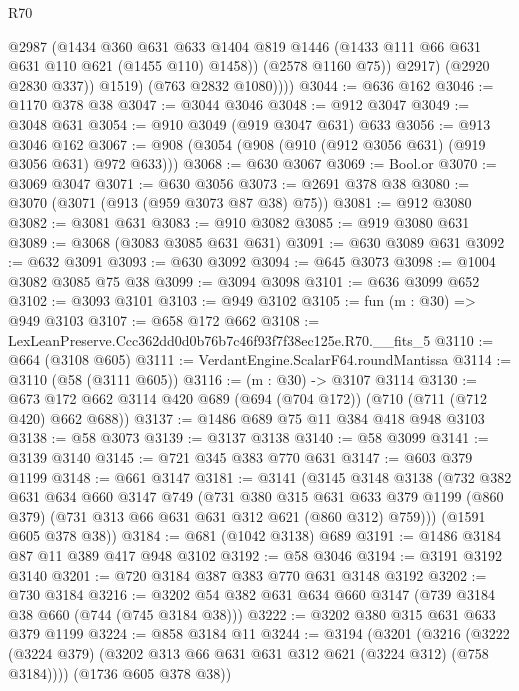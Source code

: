 \begin{lexlean}{R70}
\begin{coremodule}
                  @2987
                  (@1434
                    @360
                    @631
                    @633
                    @1404
                    @819
                    @1446
                    (@1433 @111 @66 @631 @631 @110 @621 (@1455 @110) @1458))
                  (@2578 @1160 @75))
                @2917)
              (@2920 @2830 @337))
            @1519)
          (@763 @2832 @1080))))
@3044 := @636 @162
@3046 := @1170 @378 @38
@3047 := @3044 @3046
@3048 := @912 @3047
@3049 := @3048 @631
@3054 := @910 @3049 (@919 @3047 @631) @633
@3056 := @913 @3046 @162
@3067 := @908 (@3054 (@908 (@910 (@912 @3056 @631) (@919 @3056 @631) @972 @633)))
@3068 := @630 @3067
@3069 := Bool.or
@3070 := @3069 @3047
@3071 := @630 @3056
@3073 := @2691 @378 @38
@3080 := @3070 (@3071 (@913 (@959 @3073 @87 @38) @75))
@3081 := @912 @3080
@3082 := @3081 @631
@3083 := @910 @3082
@3085 := @919 @3080 @631
@3089 := @3068 (@3083 @3085 @631 @631)
@3091 := @630 @3089 @631
@3092 := @632 @3091
@3093 := @630 @3092
@3094 := @645 @3073
@3098 := @1004 @3082 @3085 @75 @38
@3099 := @3094 @3098
@3101 := @636 @3099 @652
@3102 := @3093 @3101
@3103 := @949 @3102
@3105 := fun (m : @30) => @949 @3103
@3107 := @658 @172 @662
@3108 := LexLeanPreserve.Ccc362dd0d0b76b7c46f93f7f38ec125e.R70.__fits_5
@3110 := @664 (@3108 @605)
@3111 := VerdantEngine.ScalarF64.roundMantissa
@3114 := @3110 (@58 (@3111 @605))
@3116 := (m : @30) -> @3107 @3114
@3130 := @673 @172 @662 @3114 @420 @689 (@694 (@704 @172)) (@710 (@711 (@712 @420) @662 @688))
@3137 := @1486 @689 @75 @11 @384 @418 @948 @3103
@3138 := @58 @3073
@3139 := @3137 @3138
@3140 := @58 @3099
@3141 := @3139 @3140
@3145 := @721 @345 @383 @770 @631
@3147 := @603 @379 @1199
@3148 := @661 @3147
@3181 := @3141
    (@3145
      @3148
      @3138
      (@732
        @382
        @631
        @634
        @660
        @3147
        @749
        (@731
          @380
          @315
          @631
          @633
          @379
          @1199
          (@860 @379)
          (@731 @313 @66 @631 @631 @312 @621 (@860 @312) @759)))
      (@1591 @605 @378 @38))
@3184 := @681 (@1042 @3138) @689
@3191 := @1486 @3184 @87 @11 @389 @417 @948 @3102
@3192 := @58 @3046
@3194 := @3191 @3192 @3140
@3201 := @720 @3184 @387 @383 @770 @631 @3148 @3192
@3202 := @730 @3184
@3216 := @3202 @54 @382 @631 @634 @660 @3147 (@739 @3184 @38 @660 (@744 (@745 @3184 @38)))
@3222 := @3202 @380 @315 @631 @633 @379 @1199
@3224 := @858 @3184 @11
@3244 := @3194
    (@3201
      (@3216 (@3222 (@3224 @379) (@3202 @313 @66 @631 @631 @312 @621 (@3224 @312) (@758 @3184))))
      (@1736 @605 @378 @38))

\end{coremodule}
\end{lexlean}
